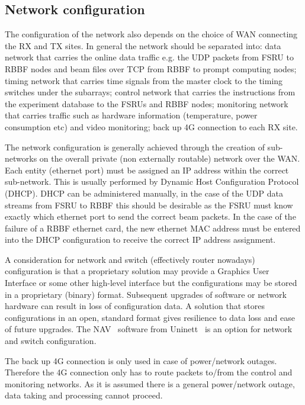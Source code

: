 \documentclass[12pt,a4paper]{article}
\begin{document}
\subsection{Network configuration} \label{ssec:network}

The configuration of the network also depends on the choice of WAN connecting the RX and TX sites.
In general the network should be separated into: data network that carries the online data traffic e.g. the UDP packets from FSRU to RBBF nodes and beam files over TCP from RBBF to prompt computing nodes; timing network that carries time signals from the master clock to the timing switches under the subarrays; control network that carries the instructions from the experiment database to the FSRUs and RBBF nodes; monitoring network that carries traffic such as hardware information (temperature, power consumption etc) and video monitoring; back up 4G connection to each RX site.

The network configuration is generally achieved through the creation of sub-networks on the overall private (non externally routable) network over the WAN.
Each entity (ethernet port) must be assigned an IP address within the correct sub-network.
This is usually performed by Dynamic Host Configuration Protocol~\cite{dhcp}  (DHCP).
DHCP can be administered manually, in the case of the UDP data streams from FSRU to RBBF this should be desirable as the FSRU must know exactly which ethernet port to send the correct beam packets.
In the case of the failure of a RBBF ethernet card, the new ethernet MAC address must be entered into the DHCP configuration to receive the correct IP address assignment.

A consideration for network and switch (effectively router nowadays) configuration is that a proprietary solution may provide a Graphics User Interface or some other high-level interface but the configurations may be stored in a proprietary (binary) format.
Subsequent upgrades of software or network hardware can result in loss of configuration data.
A solution that stores configurations in an open, standard format gives resilience to data loss and ease of future upgrades. 
The NAV~\cite{nav} software from Uninett~\cite{uninett} is an option for network and switch configuration.

The back up 4G connection is only used in case of power/network outages.
Therefore the 4G connection only has to route packets to/from the control and monitoring networks.
As it is assumed there is a general power/network outage, data taking and processing cannot proceed.
\end{document}
